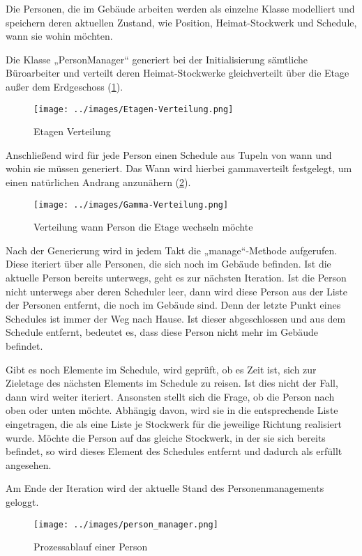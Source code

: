 \documentclass[envcountsame, envcountchap, deutsch]{i-studis}
\begin{document}
Die Personen, die im Gebäude arbeiten werden als einzelne Klasse
modelliert und speichern deren aktuellen Zustand, wie Position,
Heimat-Stockwerk und Schedule, wann sie wohin möchten.

Die Klasse „PersonManager`` generiert bei der Initialisierung sämtliche
Büroarbeiter und verteilt deren Heimat-Stockwerke gleichverteilt über
die Etage außer dem Erdgeschoss (\ref{Etagen-Verteilung}).

\begin{figure}
\centering
\texttt{[image: ../images/Etagen-Verteilung.png]}
\caption{Etagen Verteilung\label{Etagen-Verteilung}}
\end{figure}

Anschließend wird für jede Person einen Schedule aus Tupeln von wann und
wohin sie müssen generiert. Das Wann wird hierbei gammaverteilt
festgelegt, um einen natürlichen Andrang anzunähern
(\ref{Gamma-Verteilung}).

\begin{figure}
\centering
\texttt{[image: ../images/Gamma-Verteilung.png]}
\caption{Verteilung wann Person die Etage wechseln
möchte\label{Gamma-Verteilung}}
\end{figure}

Nach der Generierung wird in jedem Takt die „manage``-Methode
aufgerufen. Diese iteriert über alle Personen, die sich noch im Gebäude
befinden. Ist die aktuelle Person bereits unterwegs, geht es zur
nächsten Iteration. Ist die Person nicht unterwegs aber deren Scheduler
leer, dann wird diese Person aus der Liste der Personen entfernt, die
noch im Gebäude sind. Denn der letzte Punkt eines Schedules ist immer
der Weg nach Hause. Ist dieser abgeschlossen und aus dem Schedule
entfernt, bedeutet es, dass diese Person nicht mehr im Gebäude befindet.

Gibt es noch Elemente im Schedule, wird geprüft, ob es Zeit ist, sich
zur Zieletage des nächsten Elements im Schedule zu reisen. Ist dies
nicht der Fall, dann wird weiter iteriert. Ansonsten stellt sich die
Frage, ob die Person nach oben oder unten möchte. Abhängig davon, wird
sie in die entsprechende Liste eingetragen, die als eine Liste je
Stockwerk für die jeweilige Richtung realisiert wurde. Möchte die Person
auf das gleiche Stockwerk, in der sie sich bereits befindet, so wird
dieses Element des Schedules entfernt und dadurch als erfüllt angesehen.

Am Ende der Iteration wird der aktuelle Stand des Personenmanagements
geloggt.

\begin{figure}
\centering
\texttt{[image: ../images/person\_manager.png]}
\caption{Prozessablauf einer Person}
\end{figure}
\end{document}
